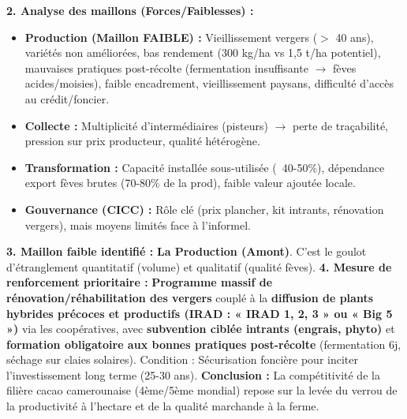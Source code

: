 \documentclass[11pt]{article}
\begin{document}
\begin{exoresolu}
\begin{center}
\end{center}
\textbf{2. Analyse des maillons (Forces/Faiblesses) :}
\begin{itemize}
    \item \textbf{Production (Maillon FAIBLE) :} Vieillissement vergers ($>$ 40 ans), variétés non améliorées, bas rendement (300 kg/ha vs 1,5 t/ha potentiel), mauvaises pratiques post-récolte (fermentation insuffisante $\to$ fèves acides/moisies), faible encadrement, vieillissement paysans, difficulté d'accès au crédit/foncier.
    \item \textbf{Collecte :} Multiplicité d'intermédiaires (pisteurs) $\to$ perte de traçabilité, pression sur prix producteur, qualité hétérogène.
    \item \textbf{Transformation :} Capacité installée sous-utilisée (~40-50\%), dépendance export fèves brutes (70-80\% de la prod), faible valeur ajoutée locale.
    \item \textbf{Gouvernance (CICC) :} Rôle clé (prix plancher, kit intrants, rénovation vergers), mais moyens limités face à l'informel.
\end{itemize}
\textbf{3. Maillon faible identifié :} \textbf{La Production (Amont)}. C'est le goulot d'étranglement quantitatif (volume) et qualitatif (qualité fèves).
\textbf{4. Mesure de renforcement prioritaire :}
\textbf{Programme massif de rénovation/réhabilitation des vergers} couplé à la \textbf{diffusion de plants hybrides précoces et productifs (IRAD : « IRAD 1, 2, 3 » ou « Big 5 »)} via les coopératives, avec \textbf{subvention ciblée intrants (engrais, phyto)} et \textbf{formation obligatoire aux bonnes pratiques post-récolte} (fermentation 6j, séchage sur claies solaires). Condition : Sécurisation foncière pour inciter l'investissement long terme (25-30 ans).
\textbf{Conclusion :} La compétitivité de la filière cacao camerounaise (4ème/5ème mondial) repose sur la levée du verrou de la productivité à l'hectare et de la qualité marchande à la ferme.
\end{exoresolu}
\end{document}
